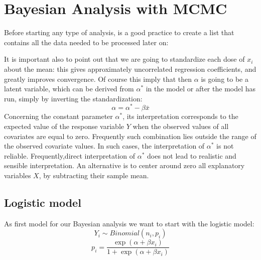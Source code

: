 \documentclass[]{article}
\newenvironment{Shaded}{\begin{snugshade}}{\end{snugshade}}
\newcommand{\DataTypeTok}[1]{\textcolor[rgb]{0.13,0.29,0.53}{#1}}
\newcommand{\DecValTok}[1]{\textcolor[rgb]{0.00,0.00,0.81}{#1}}
\newcommand{\KeywordTok}[1]{\textcolor[rgb]{0.13,0.29,0.53}{\textbf{#1}}}
\newcommand{\NormalTok}[1]{#1}
\newcommand{\OperatorTok}[1]{\textcolor[rgb]{0.81,0.36,0.00}{\textbf{#1}}}
\newcommand{\StringTok}[1]{\textcolor[rgb]{0.31,0.60,0.02}{#1}}
\begin{document}
\hypertarget{bayesian-analysis-with-mcmc}{%
\section{Bayesian Analysis with
MCMC}\label{bayesian-analysis-with-mcmc}}

Before starting any type of analysis, is a good practice to create a
list that contains all the data needed to be processed later on:

\begin{Shaded}
\end{Shaded}

It is important also to point out that we are going to standardize each
dose of \(x_i\) about the mean: this gives approximately uncorrelated
regression coefficients, and greatly improves convergence. Of course
this imply that then \(\alpha\) is going to be a latent variable, which
can be derived from \(\alpha^*\) in the model or after the model has
run, simply by inverting the standardization:
\[\alpha = \alpha^* - \beta \bar{x}\] Concerning the constant parameter
\(\alpha^*\), its interpretation corresponds to the expected value of
the response variable \(Y\) when the observed values of all covariates
are equal to zero. Frequently such combination lies outside the range of
the observed covariate values. In such cases, the interpretation of
\(\alpha^*\) is not reliable. Frequently,direct interpretation of
\(\alpha^*\) does not lead to realistic and sensible interpretation. An
alternative is to center around zero all explanatory variables \(X\), by
subtracting their sample mean.

\hypertarget{logistic-model}{%
\subsection{Logistic model}\label{logistic-model}}

As first model for our Bayesian analysis we want to start with the
logistic model: \[ Y_i \sim Binomial(n_i, p_i)\]
\[p_i = \frac{\exp(\alpha + \beta x_i)}{1 + \exp(\alpha + \beta x_i)}\]
\end{document}
